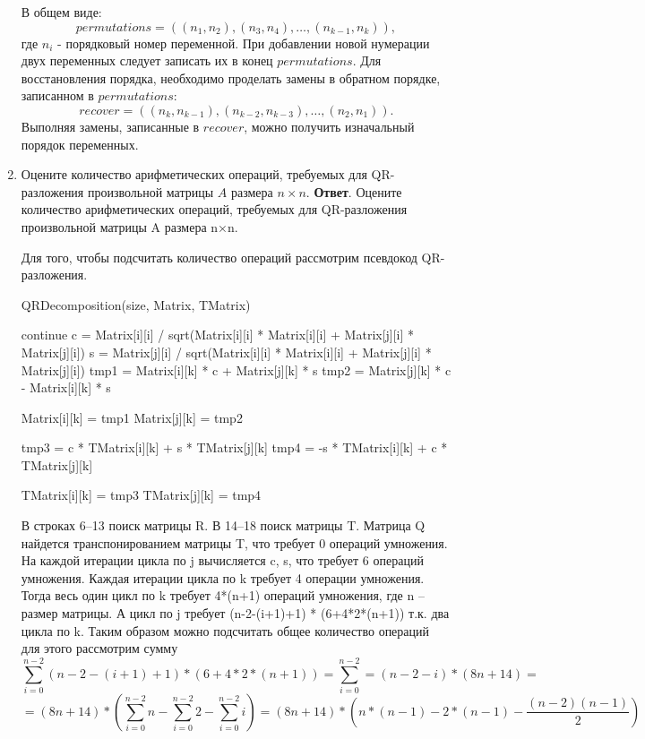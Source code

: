 \documentclass{article}
\begin{document}
\begin{enumerate}
    В общем виде:
    \begin{equation*}
        permutations = ((n_1, n_2), (n_3, n_4), \ldots, (n_{k-1}, n_k)),
    \end{equation*}
    где $n_i$ - порядковый номер переменной.
    При добавлении новой нумерации двух переменных следует записать их в конец $permutations$.
    Для восстановления порядка, необходимо проделать замены в обратном порядке, записанном в $permutations$:
    \begin{equation*}
        recover = ((n_k, n_{k-1}), (n_{k-2}, n_{k-3}), \ldots, (n_2, n_1)).
    \end{equation*}
    Выполняя замены, записанные в $recover$, можно получить изначальный порядок переменных.
    \item Оцените количество арифметических операций, требуемых для QR-разложения произвольной матрицы $A$ размера $n\times n $.
    \newline
    {\bfseries Ответ}.
    Оцените количество арифметических операций, требуемых
	для QR-разложения произвольной матрицы A размера n×n.
	
	Для того, чтобы подсчитать количество операций рассмотрим псевдокод QR-разложения.
	
	
	\noindent QRDecomposition(size, Matrix, TMatrix)
	\begin{algorithmic}[1]
					\State continue
				\EndIf
				\State c = Matrix[i][i] / sqrt(Matrix[i][i] * Matrix[i][i] + Matrix[j][i] * Matrix[j][i])
				\State s = Matrix[j][i] / sqrt(Matrix[i][i] * Matrix[i][i] + Matrix[j][i] * Matrix[j][i])
					\State tmp1 = Matrix[i][k] * c + Matrix[j][k] * s
					\State tmp2 = Matrix[j][k] * c - Matrix[i][k] * s
					
					\State Matrix[i][k] = tmp1
					\State Matrix[j][k] = tmp2
				\EndFor
				
				\State tmp3 = c * TMatrix[i][k] + s * TMatrix[j][k]
				\State tmp4 = -s * TMatrix[i][k] + c * TMatrix[j][k]
				
				\State TMatrix[i][k] = tmp3
				\State TMatrix[j][k] = tmp4
				\EndFor
			\EndFor
		\EndFor
	\end{algorithmic}
	
	В строках 6--13 поиск матрицы R. В 14--18 поиск матрицы T. Матрица Q найдется транспонированием матрицы T, что требует 0 операций умножения. На каждой итерации цикла по j вычисляется c, s, что требует 6 операций умножения. Каждая итерации цикла по k требует 4 операции умножения. Тогда весь один цикл по k требует 4*(n+1) операций умножения, где n -- размер матрицы. А цикл по j требует (n-2-(i+1)+1) * (6+4*2*(n+1)) т.к. два цикла по k. Таким образом можно подсчитать общее количество операций для этого рассмотрим сумму
	\[
	\sum \limits_{i=0}^{n-2}(n-2-(i+1)+1)*(6+4*2*(n+1)) = \sum \limits_{i=0}^{n-2}= (n-2-i)*(8n+14)=
	\]
	\[
	= (8n+14) * \left( \sum \limits_{i=0}^{n-2}n - \sum \limits_{i=0}^{n-2}2 - \sum \limits_{i=0}^{n-2}i \right) = (8n+14) * \left(n*(n-1) - 2*(n-1) - \frac{(n-2)(n-1)}{2}\right)
	\]
	

\end{enumerate}
\end{document}
